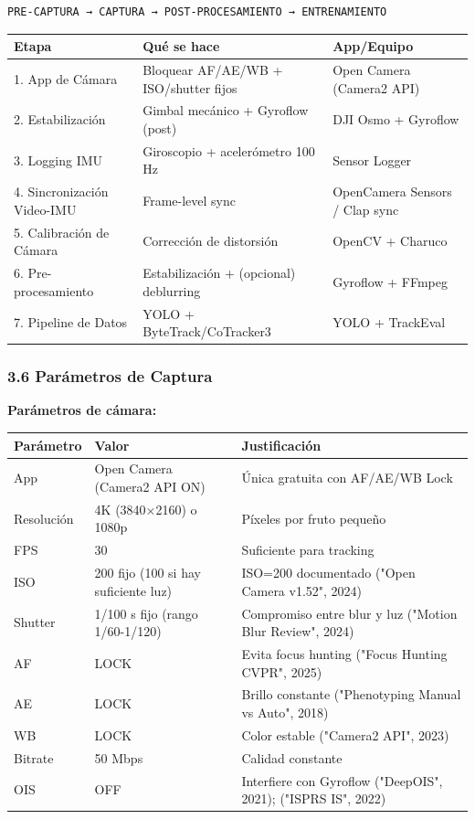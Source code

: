 \begin{verbatim}
PRE-CAPTURA → CAPTURA → POST-PROCESAMIENTO → ENTRENAMIENTO
\end{verbatim}



\begin{tabular}{lll}
\hline
Etapa & Qué se hace & App/Equipo \\
\hline
1. App de Cámara & Bloquear AF/AE/WB + ISO/shutter fijos & Open Camera (Camera2 API) \\
2. Estabilización & Gimbal mecánico + Gyroflow (post) & DJI Osmo + Gyroflow \\
3. Logging IMU & Giroscopio + acelerómetro 100 Hz & Sensor Logger \\
4. Sincronización Video-IMU & Frame-level sync & OpenCamera Sensors / Clap sync \\
5. Calibración de Cámara & Corrección de distorsión & OpenCV + Charuco \\
6. Pre-procesamiento & Estabilización + (opcional) deblurring & Gyroflow + FFmpeg \\
7. Pipeline de Datos & YOLO + ByteTrack/CoTracker3 & YOLO + TrackEval \\
\hline
\end{tabular}


\subsubsection{3.6 Parámetros de Captura}


\textbf{Parámetros de cámara:}



\begin{tabular}{lll}
\hline
Parámetro & Valor & Justificación \\
\hline
App & Open Camera (Camera2 API ON) & Única gratuita con AF/AE/WB Lock \\
Resolución & 4K (3840×2160) o 1080p & Píxeles por fruto pequeño \\
FPS & 30 & Suficiente para tracking \\
ISO & 200 fijo (100 si hay suficiente luz) & ISO=200 documentado ("Open Camera v1.52", 2024) \\
Shutter & 1/100 s fijo (rango 1/60-1/120) & Compromiso entre blur y luz ("Motion Blur Review", 2024) \\
AF & \lock{} LOCK & Evita focus hunting ("Focus Hunting CVPR", 2025) \\
AE & \lock{} LOCK & Brillo constante ("Phenotyping Manual vs Auto", 2018) \\
WB & \lock{} LOCK & Color estable ("Camera2 API", 2023) \\
Bitrate & 50 Mbps & Calidad constante \\
OIS & OFF & Interfiere con Gyroflow ("DeepOIS", 2021); ("ISPRS IS", 2022) \\
\hline
\end{tabular}


